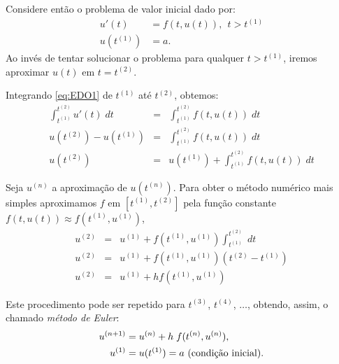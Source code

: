 Considere então o problema de valor inicial dado por:
\begin{equation}\label{eq:EDO1}
  \begin{split}
    u'(t)  &= f(t,u(t)),~~t>t^{(1)} \\
    u(t^{(1)}) &= a.
  \end{split}
\end{equation}
Ao invés de tentar solucionar o problema para qualquer $t>t^{(1)}$, iremos aproximar $u(t)$ em $t=t^{(2)}$.

Integrando \eqref{eq:EDO1} de $t^{(1)}$ até $t^{(2)}$, obtemos:
\begin{eqnarray}
  \int_{t^{(1)}}^{t^{(2)}} u'(t) \;dt &=& \int_{t^{(1)}}^{t^{(2)}} f(t,u(t)) \; dt\\
  u(t^{(2)})-u(t^{(1)})               &=& \int_{t^{(1)}}^{t^{(2)}} f(t,u(t)) \; dt\\
  u(t^{(2)})                      &=& u(t^{(1)}) +  \int _{t^{(1)}}^{t^{(2)}} f(t,u(t)) \; dt
\end{eqnarray}

Seja $u^{(n)}$ a aproximação de $u(t^{(n)})$. Para obter o método numérico mais simples aproximamos $f$ em $[t^{(1)},t^{(2)}]$ pela função constante $f(t,u(t)) \approx  f(t^{(1)},u^{(1)})$,
\begin{eqnarray}
  u^{(2)} &=&  u^{(1)} +   f(t^{(1)},u^{(1)}) \int _{t^{(1)}}^{t^{(2)}}  \; dt \\
  u^{(2)} &=&  u^{(1)} +   f(t^{(1)},u^{(1)}) (t^{(2)}-t^{(1)}) \\
  u^{(2)} &=&  u^{(1)} + h f(t^{(1)},u^{(1)})
\end{eqnarray}

Este procedimento pode ser repetido para  $t^{(3)}$, $t^{(4)}$, $\ldots$, obtendo, assim, o chamado \emph{método de Euler}:
\begin{equation}\label{eq:euler}
  \begin{split}
    u^{(n+1)}&= u^{(n)} + h\;f(t^{(n)},u^{(n)}),\\
    u^{(1)}&=u(t^{(1)})=a~ \hbox{(condição inicial)}.
  \end{split}
\end{equation}


